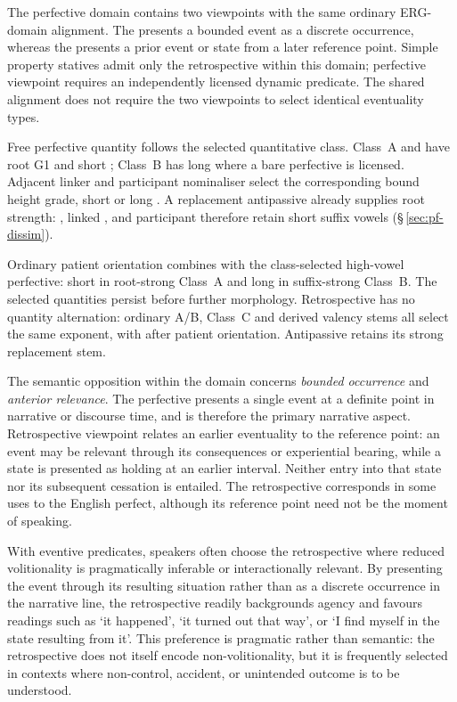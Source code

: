 The perfective domain contains two viewpoints with the same ordinary
ERG-domain alignment. The  presents a bounded event as a
discrete occurrence, whereas the  presents a prior event
or state from a later reference point. Simple property statives admit only
the retrospective within this domain; perfective viewpoint requires an
independently licensed dynamic predicate. The shared alignment does not
require the two viewpoints to select identical eventuality types.

Free perfective quantity follows the selected quantitative class.
Class~A   and  
have root G1 and short ; Class~B has long  where
a bare perfective is licensed. Adjacent linker  and participant
nominaliser  select the corresponding bound height grade,
short  or long . A replacement antipassive
already supplies root strength: , linked
, and participant  therefore
retain short suffix vowels (§\,\ref{sec:pf-dissim}).

Ordinary patient orientation combines  with the class-selected
high-vowel perfective: short  in root-strong Class~A and
long  in suffix-strong Class~B. The selected quantities
persist before further morphology. Retrospective  has no
quantity alternation: ordinary A/B, Class~C and derived valency stems
all select the same exponent, with  after patient orientation.
Antipassive  retains its strong replacement stem.

The semantic opposition within the domain concerns \emph{bounded occurrence}
and \emph{anterior relevance}. The perfective presents a single event at a
definite point in narrative or discourse time, and is therefore the primary
narrative aspect. Retrospective viewpoint relates an earlier eventuality to
the reference point: an event may be relevant through its consequences or
experiential bearing, while a state is presented as holding at an earlier
interval. Neither entry into that state nor its subsequent cessation is
entailed. The retrospective corresponds in some uses to the English perfect,
although its reference point need not be the moment of speaking.

With eventive predicates, speakers often choose the retrospective where reduced
volitionality is pragmatically inferable or interactionally relevant. By
presenting the event through its resulting situation rather than as a discrete
occurrence in the narrative line, the retrospective readily backgrounds agency
and favours readings such as `it happened', `it turned out that way', or `I find
myself in the state resulting from it'. This preference is pragmatic rather
than semantic: the retrospective does not itself encode non-volitionality, but
it is frequently selected in contexts where non-control, accident, or
unintended outcome is to be understood.

